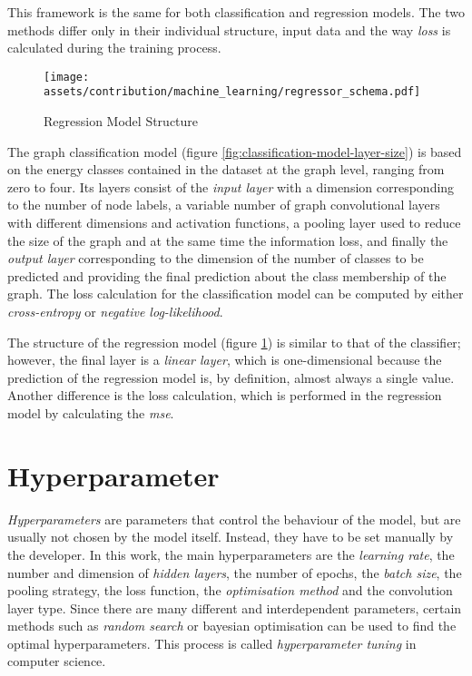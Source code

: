 \documentclass[a4paper, 12pt]{report}
\begin{document}
This framework is the same for both classification and regression models. The two methods differ only in their individual structure, input data and the way \textit{\gls{loss}} is calculated during the training process.

\begin{figure}
\centering
\texttt{[image: assets/contribution/machine\_learning/regressor\_schema.pdf]}
\caption{Regression Model Structure}
\label{fig:regression-model-layer-size}
\end{figure}

The graph classification model (figure \ref{fig:classification-model-layer-size}) is based on the energy classes contained in the dataset at the graph level, ranging from zero to four. Its layers consist of the \textit{input layer} with a dimension corresponding to the number of node labels, a variable number of graph convolutional layers with different dimensions and \gls{activation} functions, a \gls{pooling} layer used to reduce the size of the graph and at the same time the information loss, and finally the \textit{output layer} corresponding to the dimension of the number of classes to be predicted and providing the final prediction about the class membership of the graph. The \gls{loss} calculation for the classification model can be computed by either \textit{\gls{cross-entropy}} or \textit{\gls{negative log-likelihood}}.

The structure of the regression model (figure \ref{fig:regression-model-layer-size}) is similar to that of the classifier; however, the final layer is a \textit{linear layer}, which is one-dimensional because the prediction of the regression model is, by definition, almost always a single value. Another difference is the \gls{loss} calculation, which is performed in the regression model by calculating the \textit{\acrlong{mse}}.

\section{Hyperparameter}\label{sec:hyperparameter}

\textit{Hyperparameters} are parameters that control the behaviour of the model, but are usually not chosen by the model itself. Instead, they have to be set manually by the developer. In this work, the main hyperparameters are the \textit{\gls{learning rate}}, the number and dimension of \textit{hidden layers}, the number of \glspl{epoch}, the \textit{batch size}, the \gls{pooling} strategy, the \gls{loss} function, the \textit{optimisation method} and the \gls{convolution} layer type. Since there are many different and interdependent parameters, certain methods such as \textit{random search} or \Gls{bayesian optimisation} can be used to find the optimal hyperparameters. This process is called \textit{hyperparameter tuning} in computer science.
\end{document}
